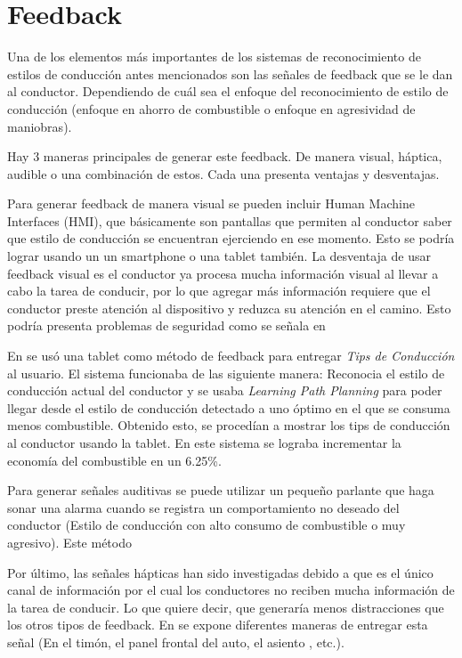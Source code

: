\section{Feedback}
Una de los elementos más importantes de los sistemas de reconocimiento de estilos de conducción antes mencionados son las señales de feedback que se le dan al conductor. Dependiendo de cuál sea el enfoque del reconocimiento de estilo de conducción (enfoque en ahorro de combustible o enfoque en agresividad de maniobras).

Hay 3 maneras principales de generar este feedback. De manera visual, háptica, audible o una combinación de estos. Cada una presenta ventajas y desventajas.

Para generar feedback de manera visual se pueden incluir Human Machine Interfaces (HMI), que básicamente son pantallas que permiten al conductor saber que estilo de conducción se encuentran ejerciendo en ese momento. Esto se podría lograr usando un un smartphone o una tablet también. La desventaja de usar feedback visual es el conductor ya procesa mucha información visual al llevar a cabo la tarea de conducir, por lo que agregar más información requiere que el conductor preste atención al dispositivo  y reduzca su atención en el camino. Esto podría presenta problemas de seguridad como se señala en \cite{benedetto2012}

En \cite{8207769} se usó una tablet como método de feedback para entregar {\it Tips de Conducción} al usuario. El sistema funcionaba de las siguiente manera: Reconocia el estilo de conducción actual del conductor y se usaba {\it Learning Path Planning} para poder llegar desde el estilo de conducción detectado a uno óptimo en el que se consuma menos combustible. Obtenido esto, se procedían a mostrar los tips de conducción al conductor usando la tablet. En este sistema se lograba incrementar la economía del combustible en un 6.25\%.

Para generar señales auditivas se puede utilizar un pequeño parlante que haga sonar una alarma cuando se registra un comportamiento no deseado del conductor (Estilo de conducción con alto consumo de combustible o muy agresivo). Este método

Por último, las señales hápticas han sido investigadas debido a que es el único canal de información por el cual los conductores no reciben mucha información de la tarea de conducir. Lo que quiere decir, que generaría menos distracciones que los otros tipos de feedback. En \cite{Hapticreview} se expone diferentes maneras de entregar esta señal (En el timón, el panel frontal del auto, el asiento , etc.).



